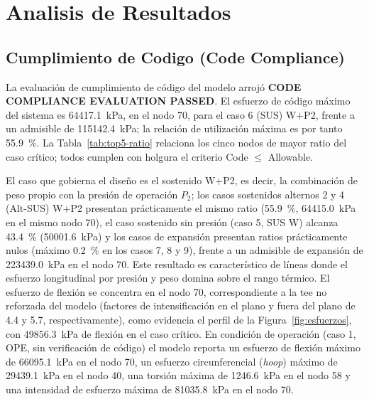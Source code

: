 \section{Analisis de Resultados}
\label{sec:analisis}

\subsection{Cumplimiento de Codigo (Code Compliance)}

La evaluaci\'{o}n de cumplimiento de c\'{o}digo del modelo arroj\'{o}
\textbf{CODE COMPLIANCE EVALUATION PASSED}. El esfuerzo de c\'{o}digo
m\'{a}ximo del sistema es \num{64417.1}~\si{kPa}, en el nodo 70, para el caso
6 (SUS) W+P2, frente a un admisible de \num{115142.4}~\si{kPa}; la
relaci\'{o}n de utilizaci\'{o}n m\'{a}xima es por tanto 55.9~\%. La
Tabla~\ref{tab:top5-ratio} relaciona los cinco nodos de mayor ratio del caso
cr\'{i}tico; todos cumplen con holgura el criterio Code $\leq$ Allowable.



El caso que gobierna el dise\~{n}o es el sostenido W+P2, es decir, la
combinaci\'{o}n de peso propio con la presi\'{o}n de operaci\'{o}n $P_2$; los
casos sostenidos alternos 2 y 4 (Alt-SUS) W+P2 presentan pr\'{a}cticamente el
mismo ratio (55.9~\%, \num{64415.0}~\si{kPa} en el mismo nodo 70), el caso
sostenido sin presi\'{o}n (caso 5, SUS W) alcanza 43.4~\%
(\num{50001.6}~\si{kPa}) y los casos de expansi\'{o}n presentan ratios
pr\'{a}cticamente nulos (m\'{a}ximo 0.2~\% en los casos 7, 8 y 9), frente a un
admisible de expansi\'{o}n de \num{223439.0}~\si{kPa} en el nodo 70. Este
resultado es caracter\'{i}stico de l\'{i}neas donde el esfuerzo longitudinal
por presi\'{o}n y peso domina sobre el rango t\'{e}rmico. El esfuerzo de
flexi\'{o}n se concentra en el nodo 70, correspondiente a la tee no reforzada
del modelo (factores de intensificaci\'{o}n en el plano y fuera del plano de
4.4 y 5.7, respectivamente), como evidencia el perfil de la
Figura~\ref{fig:esfuerzos}, con \num{49856.3}~\si{kPa} de flexi\'{o}n en el
caso cr\'{i}tico. En condici\'{o}n de operaci\'{o}n (caso 1, OPE, sin
verificaci\'{o}n de c\'{o}digo) el modelo reporta un esfuerzo de flexi\'{o}n
m\'{a}ximo de \num{66095.1}~\si{kPa} en el nodo 70, un esfuerzo
circunferencial (\textit{hoop}) m\'{a}ximo de \num{29439.1}~\si{kPa} en el
nodo 40, una torsi\'{o}n m\'{a}xima de \num{1246.6}~\si{kPa} en el nodo 58 y
una intensidad de esfuerzo m\'{a}xima de \num{81035.8}~\si{kPa} en el nodo 70.

